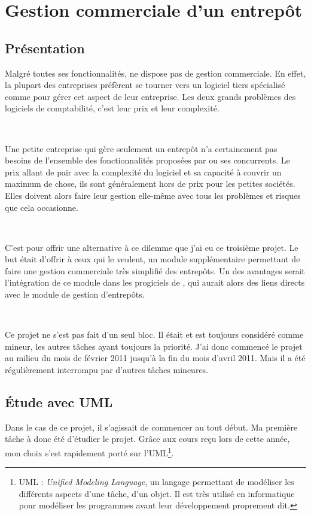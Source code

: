 \chapter{Gestion commerciale d'un entrepôt}
\section{Présentation}
Malgré toutes ses fonctionnalités, \integrale{} ne dispose pas de gestion commerciale. En effet, la plupart des entreprises préfèrent se tourner vers un logiciel  tiers spécialisé comme  pour gérer cet aspect de leur entreprise. Les deux grands problèmes des logiciels de comptabilité, c'est leur prix et leur complexité.

~

Une petite entreprise qui gère seulement un entrepôt n'a certainement pas besoins de l'ensemble des fonctionnalités proposées par  ou ses concurrents. Le prix allant de pair avec la complexité du logiciel et sa capacité à couvrir un maximum de chose, ils sont généralement hors de prix pour les petites sociétés. Elles doivent alors faire leur gestion elle-même avec tous les problèmes et risques que cela occasionne.

~

C'est pour offrir une alternative à ce dilemme que j'ai eu ce troisième projet. Le but était d'offrir à ceux qui le veulent, un module supplémentaire permettant de faire une gestion commerciale très simplifié des entrepôts. Un des avantages serait l'intégration de ce module dans les progiciels de \solulog, qui aurait alors des liens directs avec le module de gestion d'entrepôts.

~

Ce projet ne s'est pas fait d'un seul bloc. Il était et est toujours considéré comme mineur, les autres tâches ayant toujours la priorité. J'ai donc commencé le projet au milieu du mois de février 2011 jusqu'à la fin du mois d'avril 2011. Mais il a été régulièrement interrompu par d'autres tâches mineures.

\section{Étude avec UML}
Dans le cas de ce projet, il s'agissait de commencer au tout début. Ma première tâche à donc été d'étudier le projet. Grâce aux cours reçu lors de cette année, mon choix s'est rapidement porté sur l'UML\footnote{UML : \emph{Unified Modeling Language}, un \og langage \fg{} permettant de modéliser les différents aspects d'une tâche, d'un objet. Il est très utilisé en informatique pour modéliser les programmes avant leur développement proprement dit.}.

